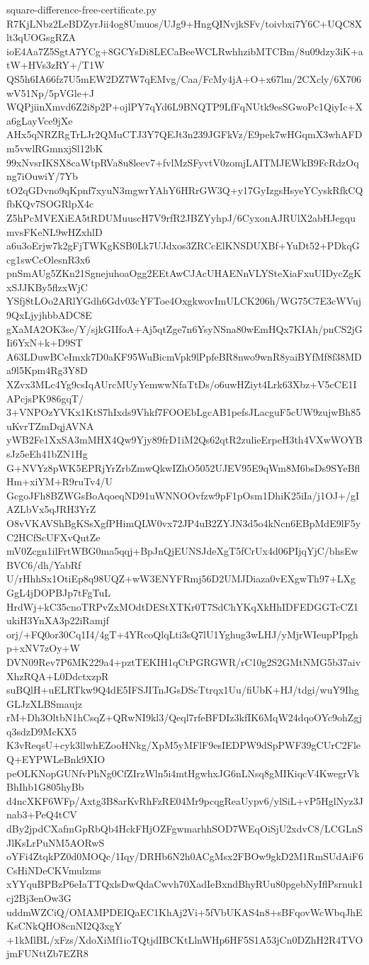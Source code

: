 \documentclass[11pt]{article}
\theoremstyle{definition}
\theoremstyle{remark}
\begin{document}
\begin{filecontents*}[overwrite]{square-difference-free-certificate.py}
R7KjLNbz2LeBDZyrJii4og8Umuos/UJg9+HngQINvjkSFv/toivbxi7Y6C+UQC8Xlt3qUOGsgRZA
ioE4Aa7Z5SgtA7YCg+8GCYsDi8LECaBeeWCLRwhhzibMTCBm/8u09dzy3iK+atW+HVs3zRY+/T1W
QS5h6IA66fz7U5mEW2DZ7W7qEMvg/Caa/FcMy4jA+O+x67lm/2CXcly/6X706wV51Np/5pVGle+J
WQPjiinXmvd6Z2i8p2P+ojlPY7qYd6L9BNQTP9LfFqNUtk9esSGwoPc1QiyIc+Xa6gLayVce9jXe
AHx5qNRZRgTrLJr2QMuCTJ3Y7QEJt3n239JGFkVz/E9pek7wHGqmX3whAFDm5vwlRGmnxjSl12bK
99xNvsrIKSX8caWtpRVa8u8leev7+fvlMzSFyvtV0zomjLAITMJEWkB9FcRdzOqng7iOuwiY/7Yb
tO2qGDvno9qKpnf7xyuN3mgwrYAhY6HRrGW3Q+y17GyIzgsHsyeYCyskRfkCQfbKQv7SOGRlpX4c
Z5hPcMVEXiEA5tRDUMuuscH7V9rfR2JBZYyhpJ/6CyxonAJRUlX2abHJegqumvsFKeNL9wHZxhlD
a6u3oErjw7k2gFjTWKgKSB0Lk7UJdxos3ZRCcElKNSDUXBf+YuDt52+PDkqGcg1swCcOlesnR3x6
pnSmAUg5ZKn21SgnejuhoaOgg2EEtAwCJAcUHAENnVLYSteXiaFxuUIDycZgKxSJJKBy5flzxWjC
YSfj8tLOo2ARlYGdh6Gdv03cYFToe4OxgkwovImULCK206h/WG75C7E3cWVuj9QxLjyjhbbADC8E
gXaMA2OK3se/Y/sjkGIIfoA+Aj5qtZge7n6YsyNSna80wEmHQx7KIAh/pnCS2jGIi6YxN+k+D9ST
A63LDuwBCeImxk7D0aKF95WuBicmVpk9lPpfeBR8nwo9wnR8yaiBYfMf8f38MDa9l5Kpm4Rg3Y8D
XZvx3MLc4Yg9csIqAUrcMUyYemwwNfaTtDs/o6uwHZiyt4Lrk63Xbz+V5cCE1IAPcjsPK986gqT/
3+VNPOzYVKx1KtS7hIxds9Vhkf7FOOEbLgcAB1pefsJLacguF5cUW9zujwBh85uKvrTZmDqjAVNA
yWB2Fe1XxSA3mMHX4Qw9Yjy89frD1iM2Qs62qtR2zulieErpeH3th4VXwWOYBsJz5eEh41bZN1Hg
G+NVYz8pWK5EPRjYrZrbZmwQkwIZhO5052UJEV95E9qWm8M6bsDs9SYeBflHm+xiYM+R9ruTv4/U
GcgoJFh8BZWGsBoAqoeqND91uWNNOOvfzw9pF1pOsm1DhiK25iIa/j1OJ+/gIAZLbVx5qJRH3YrZ
O8vVKAVShBgKSsXgfPHimQLW0vx72JP4uB2ZYJN3d5o4kNcn6EBpMdE9lF5yC2HCfScUFXvQutZe
mV0Zcgn1ilFrtWBG0ma5qqj+BpJnQjEUNSJdeXgT5fCrUx4d06PIjqYjC/bhsEwBVC6/dh/YabRf
U/rHhhSx1OtiEp8q98UQZ+wW3ENYFRmj56D2UMJDiaza0vEXgwTh97+LXgGgL4jDOPBJp7tFgTuL
HrdWj+kC35cnoTRPvZxMOdtDEStXTKr0T7SdChYKqXkHhIDFEDGGTcCZ1ukiH3YnXA3p22iRamjf
orj/+FQ0or30Cq1I4/4gT+4YRcoQlqLti3sQ7lU1Yghug3wLHJ/yMjrWIeupPIpghp+xNV7zOy+W
DVN09Rev7P6MK229a4+pztTEKIH1qCtPGRGWR/rC10g2S2GMtNMG5b37aivXhzRQA+L0DdctxzpR
suBQlH+uELRTkw9Q4dE5IFSJITnJGsDScTtrqx1Uu/fiUbK+HJ/tdgi/wuY9IhgGLJzXLBSmaujz
rM+Dh3OltbN1hCsqZ+QRwNI9kl3/Qeql7rfeBFDIz3kfIK6MqW24dqoOYc9ohZgjq3sdzD9McKX5
K3vReqsU+cyk3llwhEZooHNkg/XpM5yMFlF9esIEDPW9dSpPWF39gCUrC2FleQ+EYPWLeBnk9XIO
peOLKNopGUNfvPhNg0CfZIrzWln5i4mtHgwhxJG6nLNsq8gMIKiqcV4KwegrVkBhIhb1G805hyBb
d4ncXKF6WFp/Axtg3B8arKvRhFzRE04Mr9pcqgReaUypv6/ylSiL+vP5HglNyz3Jnab3+PeQ4tCV
dBy2jpdCXafmGpRbQb4HckFHjOZFgwmarhhSOD7WEqOiSjU2xdvC8/LCGLnSJlKsLrPuNM5AORwS
oYFi4ZtqkPZ0d0MOQc/1Iqy/DRHb6N2h0ACgMsx2FBOw9gkD2M1RmSUdAiF6CsHiNDeCKVmulzms
xYYquBPBzP6eIaTTQxlsDwQdaCwvh70XadIeBxndBhyRUu80pgebNyIflPsrnuk1cj2Bj3enOw3G
uddmWZCiQ/OMAMPDEIQaEC1KhAj2Vi+5fVbUKAS4n8+sBFqovWcWbqJhEKsCNkQHO8cnNI2Q3xgY
+1kMlBL/xFzs/XdoXiMf1ioTQtjdIBCKtLlnWHp6HF5S1A53jCn0DZhH2R4TVOjmFUNttZb7EZR8

\end{filecontents*}
\end{document}
